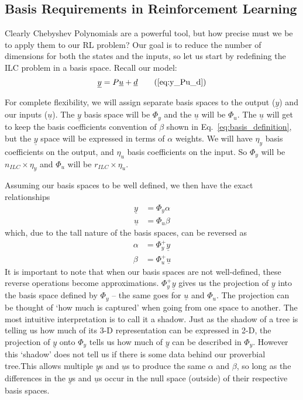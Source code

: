 \FloatBarrier\subsection{Basis Requirements in Reinforcement Learning}

Clearly Chebyshev Polynomials are a powerful tool, but how precise must we be to apply them to our RL problem? Our goal is to reduce the number of dimensions for both the states and the inputs, so let us start by redefining the ILC problem in a basis space. Recall our model:
\begin{equation}
	\underline{y} = P\underline{u} + \underline{d}
    \tag{\ref{eq:y_Pu_d}}\\
\end{equation}

For complete flexibility, we will assign separate basis spaces to the output ($\underline{y}$) and our inputs ($\underline{u}$). The $\underline{y}$ basis space will be $\Phi_y$ and the $\underline{u}$ will be $\Phi_u$. The $\underline{u}$ will get to keep the basis coefficients convention of $\beta$ shown in Eq.~\ref{eq:basis_definition}, but the $\underline{y}$ space will be expressed in terms of $\alpha$ weights. We will have $\eta_y$ basis coefficients on the output, and $\eta_u$ basis coefficients on the input. So $\Phi_y$ will be $n_{ILC} \times \eta_y$ and $\Phi_u$ will be $r_{ILC} \times \eta_u$. 

Assuming our basis spaces to be well defined, we then have the exact relationships
\begin{align}
    \underline{y} &= \Phi_y \alpha  \label{eq:y_Ty_a} \\
    \underline{u} &= \Phi_u \beta   \label{eq:u_Tu_b}
\end{align}
which, due to the tall nature of the basis spaces, can be reversed as
\begin{align}
    \alpha &= \Phi_y^+ \underline{y}   \label{eq:a_pinv_Ty_y} \\
    \beta &= \Phi_u^+ \underline{u}    \label{eq:b_pinv_Tu_u}
\end{align}
It is important to note that when our basis spaces are not well-defined, these reverse operations become approximations. $\Phi_y^+ \underline{y}$ gives us the projection of $\underline{y}$ into the basis space defined by $\Phi_y$ -- the same goes for $\underline{u}$ and $\Phi_u$. The projection can be thought of `how much is captured' when going from one space to another. The most intuitive interpretation is to call it a shadow. Just as the shadow of a tree is telling us how much of its 3-D representation can be expressed in 2-D, the projection of $\underline{y}$ onto $\Phi_y$ tells us how much of $\underline{y}$ can be described in $\Phi_y$. However this `shadow' does not tell us if there is some data behind our proverbial tree.This allows multiple $\underline{y}$s and $\underline{u}$s to produce the same $\alpha$ and $\beta$, so long as the differences in the $\underline{y}$s and $\underline{u}$s occur in the null space (outside) of their respective basis spaces.

